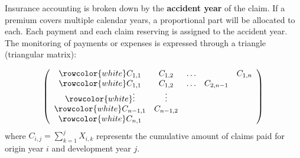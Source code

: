 \begin{f}
	
	Insurance accounting is broken down by the \textbf{accident year} of the claim. 
	If a premium covers multiple calendar years, a proportional part will be allocated to each.
	Each payment and each claim reserving is assigned to the accident year. 
	The monitoring of payments or expenses is expressed through a triangle (triangular matrix):
	
	\[
	\left(\begin{array}{ccccc}
		\rowcolor{white}	C_{1,1} & C_{1,2} & \ldots & & C_{1, n} \\
		\rowcolor{white}	C_{1,1} & C_{1,2} & \ldots & C_{2, n-1} \\
		\rowcolor{white}	\vdots & \vdots & & \\
		\rowcolor{white}	C_{n-1,1} & C_{n-1,2} & & \\
		\rowcolor{white}	C_{n, 1} & & &
	\end{array}\right)
	\]
	where \(C_{i, j}=\sum_{k=1}^{j} X_{i, k}\) represents the cumulative amount of claims paid for origin year \(i\) and development year \(j\).
	
\end{f}


